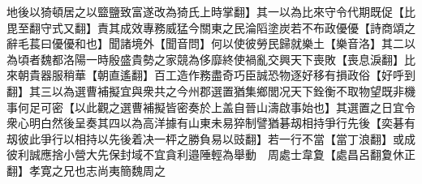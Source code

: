 地後以猗頓居之以盬鹽致富遂改為猗氏上時掌翻】其一以為比來守令代期既促【比毘至翻守式又翻】責其成效專務威猛今關東之民淪䧟塗炭若不布政優優【詩商頌之辭毛萇曰優優和也】聞諸境外【聞音問】何以使彼勞民歸就樂土【樂音洛】其二以為頃者魏都洛陽一時殷盛貴勢之家競為侈靡終使禍亂交興天下喪敗【喪息淚翻】比來朝貴器服稍華【朝直遙翻】百工造作務盡奇巧臣誠恐物逐好移有損政俗【好呼到翻】其三以為選曹補擬宜與衆共之今州郡選置猶集鄉閭况天下銓衡不取物望既非機事何足可密【以此觀之選曹補擬皆密奏於上盖自晉山濤啟事始也】其選置之日宜令衆心明白然後呈奏其四以為高洋據有山東未易猝制譬猶碁刼相持爭行先後【奕碁有刼彼此爭行以相持以先後着决一枰之勝負易以豉翻】若一行不當【當丁浪翻】或成彼利誠應捨小營大先保封域不宜貪利邉陲輕為舉動　周處士韋夐【處昌呂翻夐休正翻】孝寛之兄也志尚夷簡魏周之